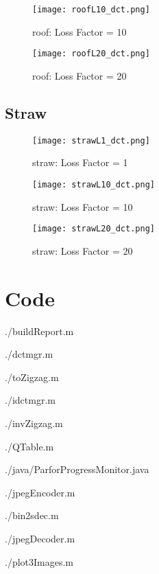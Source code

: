\documentclass{article} %
\begin{document}
\begin{figure}[H]
\centering
\texttt{[image: roofL10\_dct.png]}
\caption{roof: Loss Factor = 10}
\end{figure}

\begin{figure}[H]
\centering
\texttt{[image: roofL20\_dct.png]}
\caption{roof: Loss Factor = 20}
\end{figure}

\subsection{Straw}
\begin{figure}[H]
\centering
\texttt{[image: strawL1\_dct.png]}
\caption{straw: Loss Factor = 1}
\end{figure}

\begin{figure}[H]
\centering
\texttt{[image: strawL10\_dct.png]}
\caption{straw: Loss Factor = 10}
\end{figure}

\begin{figure}[H]
\centering
\texttt{[image: strawL20\_dct.png]}
\caption{straw: Loss Factor = 20}
\end{figure}


\section{Code}

{./buildReport.m} 

{./dctmgr.m} 

{./toZigzag.m} 

{./idctmgr.m} 

{./invZigzag.m} 

{./QTable.m}  

{./java/ParforProgressMonitor.java} 

{./jpegEncoder.m}

{./bin2sdec.m}  

{./jpegDecoder.m}  

{./plot3Images.m}  
\end{document}
